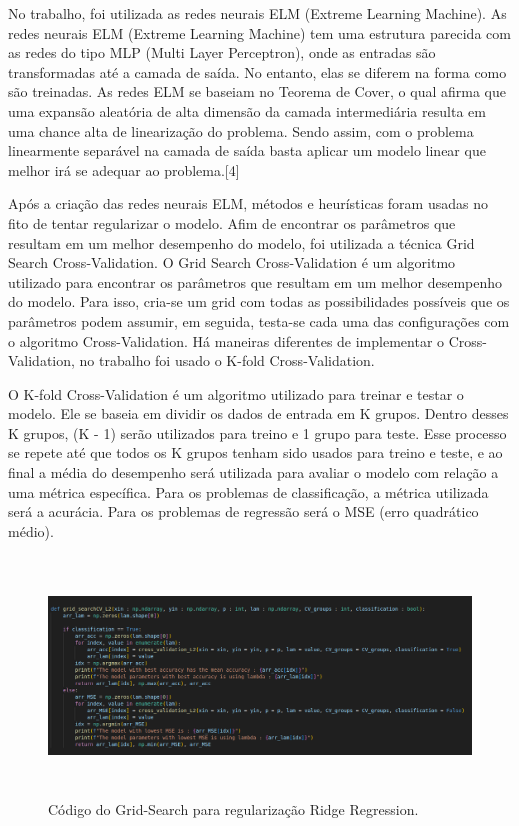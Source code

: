 \documentclass{article}
\begin{document}
No trabalho, foi utilizada as redes neurais ELM (Extreme Learning Machine). As redes neurais ELM (Extreme Learning Machine) tem uma estrutura parecida com as redes do tipo MLP (Multi Layer Perceptron), onde as entradas são transformadas até a camada de saída. No entanto, elas se diferem na forma como são treinadas. As redes ELM se baseiam no Teorema de Cover, o qual afirma que uma expansão aleatória de alta dimensão da camada intermediária resulta em uma chance alta de linearização do problema. Sendo assim, com o problema linearmente separável na camada de saída basta aplicar um modelo linear que melhor irá se adequar ao problema.[4]

\vspace{15pt}

Após a criação das redes neurais ELM, métodos e heurísticas foram usadas no fito de tentar regularizar o modelo. Afim de encontrar os parâmetros que resultam em um melhor desempenho do modelo, foi utilizada a técnica Grid Search Cross-Validation. O Grid Search Cross-Validation é um algoritmo utilizado para encontrar os parâmetros que resultam em um melhor desempenho do modelo. Para isso, cria-se um grid com todas as possibilidades possíveis que os parâmetros podem assumir, em seguida, testa-se cada uma das configurações com o algoritmo Cross-Validation. Há maneiras diferentes de implementar o Cross-Validation, no trabalho foi usado o K-fold Cross-Validation.

\vspace{15pt}

O K-fold Cross-Validation é um algoritmo utilizado para treinar e testar o modelo. Ele se baseia em dividir os dados de entrada em K grupos. Dentro desses K grupos, (K - 1) serão utilizados para treino e 1 grupo para teste. Esse processo se repete até que todos os K grupos tenham sido usados para treino e teste, e ao final a média do desempenho será utilizada para avaliar o modelo com relação a uma métrica específica. Para os problemas de classificação, a métrica utilizada será a acurácia. Para os problemas de regressão será o MSE (erro quadrático médio).

\vspace{15pt}

\begin{figure}[h]

    \centering
    \includegraphics[height=2.5in]{grid_search_L2.png}
    \caption{Código do Grid-Search para regularização Ridge Regression.}
    \label{fig:example}
    
\end{figure}
\end{document}
